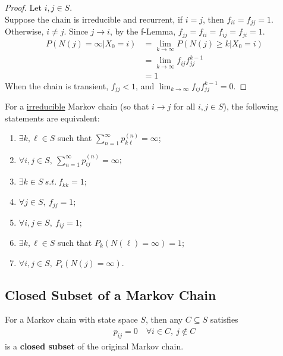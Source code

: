 \documentclass{article}
\newcommand{\upn}[0]{^{(n)}}
\begin{document}
    \begin{proof}
    	Let $i, j \in S$. \\
    	Suppose the chain is irreducible and recurrent, if $i = j$, then $f_{ii} = f_{jj} = 1$. \\
    	Otherwise, $i \neq j$. Since $j \to i$, by the f-Lemma, $f_{jj} = f_{ii} = f_{ij} = f_{ji} = 1$.
    	\begin{align}
    		P(N(j) = \infty | X_0 = i)
    		&= \lim_{k \to \infty} P(N(j) \geq k | X_0 = i) \\
    		&= \lim_{k \to \infty} f_{ij} f_{jj}^{k-1} \\
    		&= 1
    	\end{align}
    	When the chain is transient, $f_{jj} < 1$, and $\lim_{k \to \infty} f_{ij} f_{jj}^{k-1} = 0$.
    \end{proof}
    
    \begin{theorem}
    	For a \ul{irreducible} Markov chain (so that $i \to j$ for all $i, j \in S$), the following statements are equivalent:
    	\begin{enumerate}[(1)]
    		\item $\exists k, \ell \in S$ such that $\sum_{n=1}^\infty p_{k \ell}\upn = \infty$;
    		\item $\forall i,j \in S,\ \sum_{n=1}^\infty p_{ij}\upn = \infty$;
    		\item $\exists k \in S\ s.t.\ f_{kk} = 1$;
    		\item $\forall j \in S,\ f_{jj} = 1$;
    		\item $\forall i,j \in S,\ f_{ij} = 1$;
    		\item $\exists k, \ell \in S$ such that $P_k(N(\ell) = \infty) = 1$;
    		\item $\forall i, j \in S,\ P_i(N(j) = \infty)$.
    	\end{enumerate}
    \end{theorem}
    
    \subsection{Closed Subset of a Markov Chain}
    
    \begin{definition}
    	For a Markov chain with state space $S$, then any $C \subseteq S$ satisfies
    	\begin{align}
    		p_{ij} = 0\quad \forall i \in C,\ j \notin C
    	\end{align}
    	is a \textbf{closed subset} of the original Markov chain.
    \end{definition}
    
\end{document}
